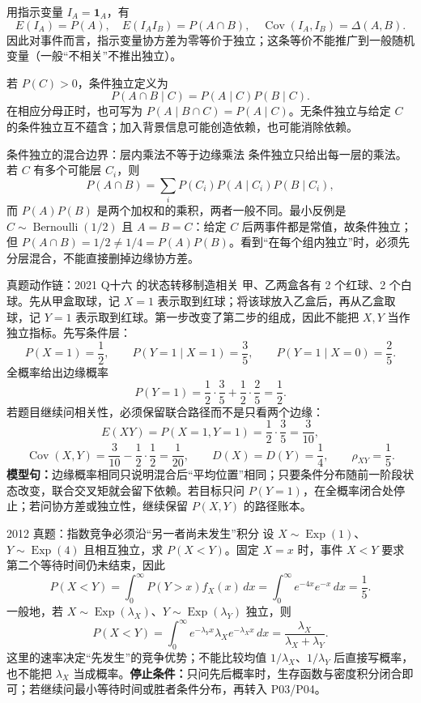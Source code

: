 \documentclass[11pt,a4paper]{ctexart}
\newcommand{\kw}[1]{\textbf{\color{deep}#1}}
\begin{document}
用指示变量 $I_A=\mathbf1_A$，有
\[
E(I_A)=P(A),\quad E(I_AI_B)=P(A\cap B),\quad
\operatorname{Cov}(I_A,I_B)=\Delta(A,B).
\]
因此对事件而言，指示变量协方差为零等价于独立；这条等价不能推广到一般随机变量（一般“不相关”不推出独立）。

若 $P(C)>0$，条件独立定义为
\[
\boxed{P(A\cap B\mid C)=P(A\mid C)P(B\mid C)}.
\]
在相应分母正时，也可写为 $P(A\mid B\cap C)=P(A\mid C)$。无条件独立与给定 $C$ 的条件独立互不蕴含；加入背景信息可能创造依赖，也可能消除依赖。

\begin{methodbox}{条件独立的混合边界：层内乘法不等于边缘乘法}
条件独立只给出每一层的乘法。若 $C$ 有多个可能层 $C_i$，则
\[
P(A\cap B)=\sum_iP(C_i)P(A\mid C_i)P(B\mid C_i),
\]
而 $P(A)P(B)$ 是两个加权和的乘积，两者一般不同。最小反例是 $C\sim\operatorname{Bernoulli}(1/2)$ 且 $A=B=C$：给定 $C$ 后两事件都是常值，故条件独立；但 $P(A\cap B)=1/2\ne1/4=P(A)P(B)$。看到“在每个组内独立”时，必须先分层混合，不能直接删掉边缘协方差。
\end{methodbox}

\begin{examplebox}{真题动作链：2021 Q十六 的状态转移制造相关}
甲、乙两盒各有 2 个红球、2 个白球。先从甲盒取球，记
$X=1$ 表示取到红球；将该球放入乙盒后，再从乙盒取球，记
$Y=1$ 表示取到红球。第一步改变了第二步的组成，因此不能把
$X,Y$ 当作独立指标。先写条件层：
\[
P(X=1)=\frac12,\qquad
P(Y=1\mid X=1)=\frac35,\qquad
P(Y=1\mid X=0)=\frac25.
\]
全概率给出边缘概率
\[
P(Y=1)=\frac12\cdot\frac35+\frac12\cdot\frac25=\frac12.
\]
若题目继续问相关性，必须保留联合路径而不是只看两个边缘：
\[
E(XY)=P(X=1,Y=1)=\frac12\cdot\frac35=\frac3{10},
\]
\[
\operatorname{Cov}(X,Y)=\frac3{10}-\frac12\cdot\frac12=\frac1{20},
\qquad
D(X)=D(Y)=\frac14,
\qquad \rho_{XY}=\frac15.
\]
\kw{模型句：}边缘概率相同只说明混合后“平均位置”相同；只要条件分布随前一阶段状态改变，联合交叉矩就会留下依赖。若目标只问 $P(Y=1)$，在全概率闭合处停止；若问协方差或独立性，继续保留 $P(X,Y)$ 的路径账本。
\end{examplebox}

\begin{examplebox}{2012 真题：指数竞争必须沿“另一者尚未发生”积分}
设 $X\sim\operatorname{Exp}(1)$、$Y\sim\operatorname{Exp}(4)$ 且相互独立，求 $P(X<Y)$。固定 $X=x$ 时，事件 $X<Y$ 要求第二个等待时间仍未结束，因此
\[
P(X<Y)=\int_0^\infty P(Y>x)f_X(x)\,dx
 =\int_0^\infty e^{-4x}e^{-x}\,dx=\frac15.
\]
一般地，若 $X\sim\operatorname{Exp}(\lambda_X)$、$Y\sim\operatorname{Exp}(\lambda_Y)$ 独立，则
\[
P(X<Y)=\int_0^\infty e^{-\lambda_Yx}\lambda_Xe^{-\lambda_Xx}\,dx
 =\frac{\lambda_X}{\lambda_X+\lambda_Y}.
\]
这里的速率决定“先发生”的竞争优势；不能比较均值 $1/\lambda_X$、$1/\lambda_Y$ 后直接写概率，也不能把 $\lambda_X$ 当成概率。\textbf{停止条件：}只问先后概率时，生存函数与密度积分闭合即可；若继续问最小等待时间或胜者条件分布，再转入 P03/P04。
\end{examplebox}
\end{document}
